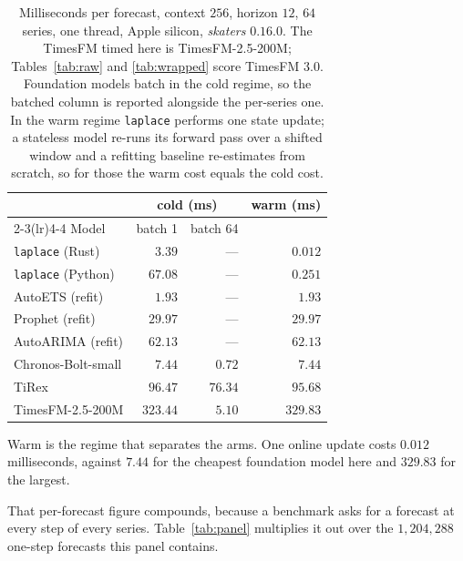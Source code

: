 \documentclass[article]{jss}
\providecommand{\proglang}[1]{\textsf{#1}}
\providecommand{\pkg}[1]{\textit{#1}}
\renewcommand{\pkg}[1]{\textit{#1}}
\providecommand{\code}[1]{\texttt{#1}}
\begin{document}
\begin{table}[t!]
\centering
\small
\begin{tabular}{lrrr}
\toprule
 & \multicolumn{2}{c}{cold (ms)} & warm (ms) \\
\cmidrule(lr){2-3}\cmidrule(lr){4-4}
Model & batch 1 & batch 64 & \\
\midrule
\code{laplace} (\proglang{Rust})   & $3.39$   & ---     & $0.012$ \\
\code{laplace} (\proglang{Python}) & $67.08$  & ---     & $0.251$ \\
AutoETS (refit)                     & $1.93$   & ---     & $1.93$ \\
Prophet (refit)                     & $29.97$  & ---     & $29.97$ \\
AutoARIMA (refit)                   & $62.13$  & ---     & $62.13$ \\
Chronos-Bolt-small                  & $7.44$   & $0.72$  & $7.44$ \\
TiRex                               & $96.47$  & $76.34$ & $95.68$ \\
TimesFM-2.5-200M                    & $323.44$ & $5.10$  & $329.83$ \\
\bottomrule
\end{tabular}
\caption{Milliseconds per forecast, context $256$, horizon $12$, $64$ series,
one thread, Apple silicon, \pkg{skaters} $0.16.0$. The TimesFM timed here is
TimesFM-2.5-200M; Tables~\ref{tab:raw} and \ref{tab:wrapped} score TimesFM 3.0.
Foundation models batch in
the cold regime, so the batched column is reported alongside the per-series one.
In the warm regime \code{laplace} performs one state update; a stateless model
re-runs its forward pass over a shifted window and a refitting baseline
re-estimates from scratch, so for those the warm cost equals the cold cost.}
\label{tab:perf}
\end{table}

Warm is the regime that separates the arms. One online update costs $0.012$
milliseconds, against $7.44$ for the cheapest foundation model here and $329.83$
for the largest.

That per-forecast figure compounds, because a benchmark asks for a forecast at
every step of every series. Table~\ref{tab:panel} multiplies it out over the
$1{,}204{,}288$ one-step forecasts this panel contains.
\end{document}
